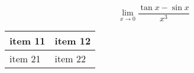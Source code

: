 \documentclass[14pt]{extarticle}
\begin{document}
\begin{equation*}
\lim_{x \to 0} \frac{\tan{x} - \sin{x}}{x^3} 
\end{equation*}


\begin{tabu} to 1\textwidth { | X[l] | X[l]| }
 \hline
 item 11 & item 12  \\
 \hline
 item 21  & item 22  \\
\hline
\end{tabu}
\end{document}
